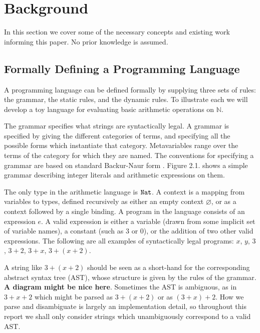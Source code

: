 \chapter{Background}\label{C:background}

In this section we cover some of the necessary concepts and existing work informing this paper. No prior knowledge is assumed.

\section{Formally Defining a Programming Language}

A programming language can be defined formally by supplying three sets of rules: the grammar, the static rules, and the dynamic rules. To illustrate each we will develop a toy language for evaluating basic arithmetic operations on $\mathbb{N}$.

The grammar specifies what strings are syntactically legal. A grammar is specified by giving the different categories of terms, and specifying all the possible forms which instantiate that category. Metavariables range over the terms of the category for which they are named. The conventions for specifying a grammar are based on standard Backur-Naur form \cite{bnf}. Figure 2.1. shows a simple grammar describing integer literals and arithmetic expressions on them.

The only type in the arithmetic language is $\mathtt{Nat}$. A context is a mapping from variables to types, defined recursively as either an empty context $\varnothing$, or as a context followed by a single binding. A program in the language consists of an expression $e$. A valid expression is either a variable (drawn from some implicit set of variable names), a constant (such as $3$ or $0$), or the addition of two other valid expressions. The following are all examples of syntactically legal programs: $x$, $y$, $3$, $3+2$, $3+x$, $3+(x+2)$.

A string like $3 + (x + 2)$ should be seen as a short-hand for the corresponding abstract syntax tree (AST), whose structure is given by the rules of the grammar. \textbf{A diagram might be nice here}. Sometimes the AST is ambiguous, as in $3 + x + 2$ which might be parsed as $3 + (x + 2)$ or as $(3 + x) + 2$. How we parse and disambiguate is largely an implementation detail, so throughout this report we shall only consider strings which unambiguously correspond to a valid AST.\\

